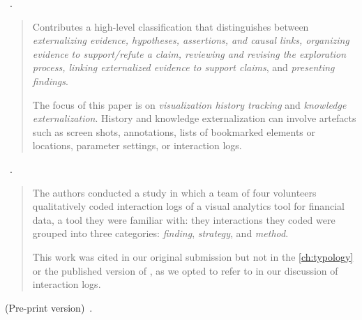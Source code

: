\begin{sloppypar}
~\cite{Shrinivasan2008}. \end{sloppypar}

\begin{quotation}
     Contributes a high-level classification that distinguishes between {\it externalizing evidence, hypotheses, assertions, and causal links, organizing evidence to support/refute a claim, reviewing and revising the exploration process, linking externalized evidence to support claims}, and {\it presenting findings}.
     
    The focus of this paper is on {\it visualization history tracking} and {\it knowledge externalization}.
    History and knowledge externalization can involve artefacts such as screen shots, annotations, lists of bookmarked elements or locations, parameter settings, or interaction logs.
\end{quotation}

\begin{sloppypar}
~\cite{Dou2009}. \end{sloppypar}

\begin{quotation}
    The authors conducted a study in which a team of four volunteers qualitatively coded interaction logs of a visual analytics tool for financial data, a tool they were familiar with: they interactions they coded were grouped into three categories: {\it finding}, {\it strategy}, and {\it method}.
    
    This work was cited in our original submission but not in the  \autoref{ch:typology} or the published version of \citet{Brehmer2013}, as we opted to refer to \citet{Shrinivasan2008} in our discussion of interaction logs.
\end{quotation}

\begin{sloppypar}
 (Pre-print version)~\cite{Rensink2014}. \end{sloppypar}

